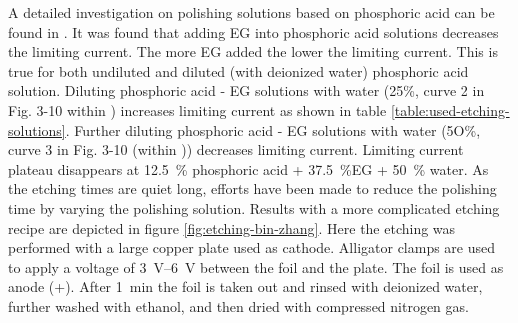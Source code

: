 %
A detailed investigation on polishing solutions based on phosphoric acid can be found in \cite{jinshan_electrochemical_2004}. It was found that adding EG into phosphoric acid solutions decreases the  limiting current. The more EG added the lower the limiting current. This is true for both undiluted and diluted (with deionized water) phosphoric acid solution. Diluting phosphoric acid - EG solutions with water (25\%, curve 2 in Fig. 3-10 within \cite{jinshan_electrochemical_2004} ) increases limiting current as shown in table \ref{table:used-etching-solutions}. Further diluting phosphoric acid - EG solutions with water (5O\%, curve 3 in Fig. 3-10 (within \cite{jinshan_electrochemical_2004} )) decreases limiting current. Limiting current plateau disappears at \SI{12.5}{\percent} phosphoric acid + \SI{37.5}{\percent}EG + \SI{50}{\percent} water. 
As the etching times are quiet long, efforts have been made to reduce the polishing time by varying the polishing solution. Results with a more complicated etching recipe \cite{bin_zhang_low-temperature_2012} are depicted in figure \ref{fig:etching-bin-zhang}. Here the etching was performed with a large copper plate used as cathode. Alligator clamps are used to apply a voltage of \SIrange{3}{6}{\volt} between the foil and the plate. The foil is used as anode (+). After \SI{1}{\minute} the foil is taken out and rinsed with deionized water, further washed with ethanol, and then dried with compressed nitrogen gas. 


